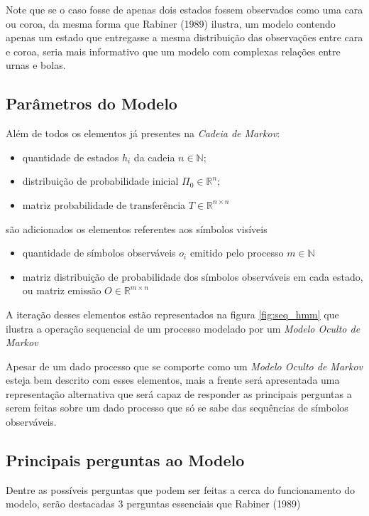 \documentclass{subfiles}
\begin{document}
Note que se o caso fosse de apenas dois estados fossem observados como uma cara ou coroa, da mesma forma que Rabiner (1989) \autocite{Rabiner:1989tut} ilustra, um modelo contendo apenas um estado que entregasse a mesma distribuição das observações entre cara e coroa, seria mais informativo que um modelo com complexas relações entre urnas e bolas.

\subsection{Parâmetros do Modelo}

Além de todos os elementos já presentes na \textit{Cadeia de Markov}:
\begin{itemize}
    \item quantidade de estados $h_i$ da cadeia $n \in \mathbb{N}$;
    \item distribuição de probabilidade inicial $\Pi_0 \in \mathbb{R}^n$; 
    \item matriz probabilidade de transferência $T \in \mathbb{R}^{n \times n}$
\end{itemize}
são adicionados os elementos referentes aos símbolos visíveis
\begin{itemize}
    \item quantidade de símbolos observáveis $o_i$ emitido pelo processo $m \in \mathbb{N}$
    \item matriz distribuição de probabilidade dos símbolos observáveis em cada estado, ou matriz emissão $O \in \mathbb{R}^{m \times n}$
\end{itemize}
A iteração desses elementos estão representados na figura \ref{fig:seq_hmm} que ilustra a operação sequencial de um processo modelado por um \textit{Modelo Oculto de Markov}

Apesar de um dado processo que se comporte como um \textit{Modelo Oculto de Markov} esteja bem descrito com esses elementos, mais a frente será apresentada uma representação alternativa que será capaz de responder as principais perguntas a serem feitas sobre um dado processo que só se sabe das sequências de símbolos observáveis.

\subsection{Principais perguntas ao Modelo}

Dentre as possíveis perguntas que podem ser feitas a cerca do funcionamento do modelo, serão destacadas 3 perguntas essenciais que Rabiner (1989) \autocite{Rabiner:1989tut}
\end{document}
